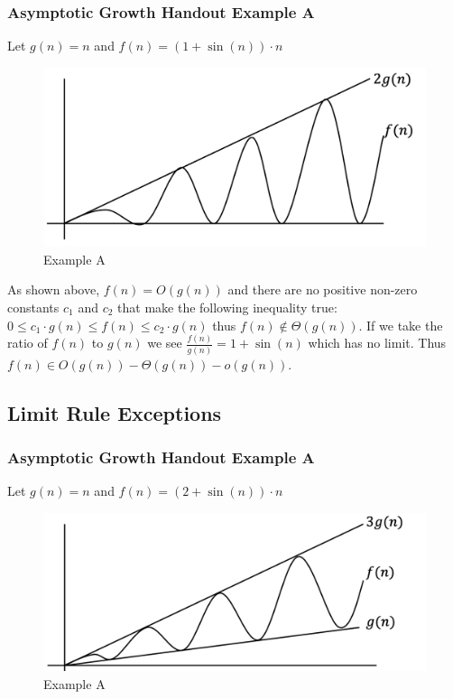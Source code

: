 \documentclass{article}
\begin{document}
\subsubsection{Asymptotic Growth Handout Example A}

Let $g(n) = n$ and $f(n) = (1 + \sin(n)) \cdot n$

\begin{figure}[H]
    \centering
    \includegraphics[scale=.4]{Figures/cse102lecture3exampleA.png}
    \caption{Example A}
    \label{lecture3exampleA}
\end{figure}

As shown above, $f(n) = O(g(n))$ and there are no positive non-zero constants $c_1$ and $c_2$ that make the following inequality true: $0 \leq c_1 \cdot g(n) \leq f(n) \leq c_2 \cdot g(n)$ thus $f(n) \notin \Theta(g(n))$. If we take the ratio of $f(n)$ to $g(n)$ we see $\frac{f(n)}{g(n)} = 1 + \sin(n)$ which has no limit. Thus $f(n) \in O(g(n)) - \Theta(g(n)) - o(g(n))$.

\subsection{Limit Rule Exceptions}

\subsubsection{Asymptotic Growth Handout Example A}

Let $g(n) = n$ and $f(n) = (2 + \sin(n)) \cdot n$

\begin{figure}[H]
    \centering
    \includegraphics[scale=.4]{Figures/cse102lecture3exampleB.png}
    \caption{Example A}
    \label{lecture3exampleB}
\end{figure}
\end{document}

